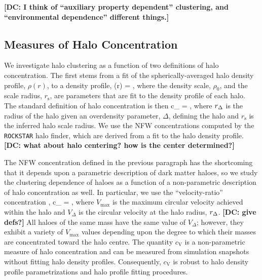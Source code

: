 \documentclass[usenatbib,fleqn]{mnras}
\begin{document}
{\bf [DC: I think of ``auxiliary property dependent'' clustering, and ``environmental dependence'' different things.]}

\subsection{Measures of Halo Concentration}

We investigate halo clustering as a function of two definitions of halo concentration. The first stems from a fit of the spherically-averaged halo density profile, $\rho(r)$, to a \citet[hereafter NFW]{navarro_etal97} density profile, 
%
\beq
\rho(r) = ,
\eeq
%
where the density scale, $\rho_0$, and the scale radius, $r_{\mathrm{s}}$, are parameters that are fit to the density profile of each halo. The standard definition of halo concentration is then 
\beq
c_{} = ,
\eeq
where $r_{\Delta}$ is the radius of the halo given an overdensity parameter, $\Delta$, defining the halo and $r_{\mathrm{s}}$ is the inferred halo scale radius. We use the NFW concentrations computed by the {\tt ROCKSTAR} halo finder, which are derived from a fit to the halo density profile.  {\bf [DC: what about halo centering?  how is the center determined?]}


The NFW concentration defined in the previous paragraph has the shortcoming that it 
depends upon a parametric description of dark matter haloes, so we study the clustering dependence of haloes as a function of a non-parametric description of halo concentration as well. In particular, we use the ``velocity-ratio'' concentration \citep{prada_etal12,klypin_etal16},
%
\beq
c_{} = , 
\eeq
%
where $V_{\mathrm{max}}$ is the maximum circular velocity achieved within the halo and $V_{\Delta}$ is the circular velocity at the halo radius, $r_{\Delta}$. {\bf [DC: give defs?]} All haloes of the same mass have the same value of $V_{\Delta}$; however, 
they exhibit a variety of $V_{\mathrm{max}}$ values depending upon the degree to which their masses are concentrated toward the halo centre. The quantity $c_{\mathrm{V}}$ is a non-parametric measure of halo concentration and can be measured from simulation snapshots without fitting halo density profiles. Consequently, $c_{\mathrm{V}}$ is robust to halo density profile parametrizations and halo profile fitting procedures. 
\end{document}
